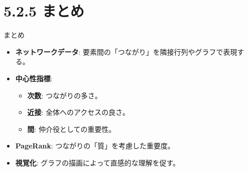 \documentclass[
  ignorenonframetext,
]{beamer}
\providecommand{\tightlist}{%
  \setlength{\itemsep}{0pt}\setlength{\parskip}{0pt}}
\begin{document}
\hypertarget{ux307eux3068ux3081}{%
\section{5.2.5 まとめ}\label{ux307eux3068ux3081}}

\begin{frame}{まとめ}
\protect\hypertarget{ux307eux3068ux3081-1}{}
\begin{itemize}
\tightlist
\item
  \textbf{ネットワークデータ}:
  要素間の「つながり」を隣接行列やグラフで表現する。
\item
  \textbf{中心性指標}:

  \begin{itemize}
  \tightlist
  \item
    \textbf{次数}: つながりの多さ。
  \item
    \textbf{近接}: 全体へのアクセスの良さ。
  \item
    \textbf{間}: 仲介役としての重要性。
  \end{itemize}
\item
  \textbf{PageRank}: つながりの「質」を考慮した重要度。
\item
  \textbf{視覚化}: グラフの描画によって直感的な理解を促す。
\end{itemize}
\end{frame}
\end{document}
